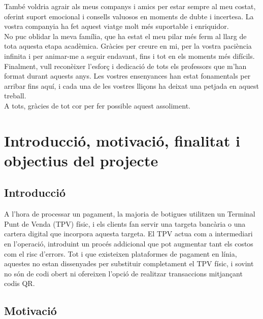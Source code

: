 \documentclass[a4paper,12pt,twoside]{ThesisStyle}
\begin{document}
També voldria agrair als meus companys i amics per estar sempre al meu costat, oferint suport emocional i consells valuosos en moments de dubte i incertesa. La vostra companyia ha fet aquest viatge molt més suportable i enriquidor.\\

No puc oblidar la meva família, que ha estat el meu pilar més ferm al llarg de tota aquesta etapa acadèmica. Gràcies per creure en mi, per la vostra paciència infinita i per animar-me a seguir endavant, fins i tot en els moments més difícils.\\

Finalment, vull reconèixer l’esforç i dedicació de tots els professors que m’han format durant aquests anys. Les vostres ensenyances han estat fonamentals per arribar fins aquí, i cada una de les vostres lliçons ha deixat una petjada en aquest treball.\\

A tots, gràcies de tot cor per fer possible aquest assoliment.


\tableofcontents

\listoffigures

\listoftables

\mainmatter



\chapter{Introducció, motivació, finalitat i objectius del projecte}
\label{chp:intro}

\section{Introducció}
\label{sec:introduccio}

A l'hora de processar un pagament, la majoria de botigues utilitzen un Terminal Punt de Venda (TPV) físic, i els clients fan servir una targeta bancària o una cartera digital que incorpora aquesta targeta. El TPV actua com a intermediari en l'operació, introduint un procés addicional que pot augmentar tant els costos com el risc d'errors. Tot i que existeixen plataformes de pagament en línia, aquestes no estan dissenyades per substituir completament el TPV físic, i sovint no són de codi obert ni ofereixen l'opció de realitzar transaccions mitjançant codis QR.

\section{Motivació}
\label{subsec:motivacio}
\end{document}
